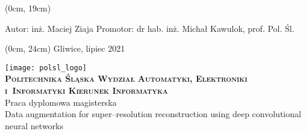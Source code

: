 \thispagestyle{empty}
\textblockorigin{3cm}{2.5cm}

\begin{onehalfspacing}
\begin{center}
    \begin{textblock*}{\textwidth}(0cm, 19cm)
	\begin{flushleft}
	Autor: inż. Maciej Ziaja \linebreak
	Promotor: dr hab. inż. Michał Kawulok, prof. Pol. Śl. \linebreak
	\end{flushleft}
	\end{textblock*}
	\begin{textblock*}{\textwidth}(0cm, 24cm)
	\fontsize{12}{12} \selectfont
	Gliwice, lipiec 2021
	\end{textblock*}
    \vspace{2\baselineskip}
	\texttt{[image: polsl\_logo]}\\
	\vspace{2\baselineskip}
	\fontsize{18}{18} \selectfont
	\textbf{\textsc{Politechnika Śląska \linebreak
	Wydział Automatyki, Elektroniki i~Informatyki \linebreak
	Kierunek Informatyka}} \\
	\vspace{3\baselineskip}
	Praca dyplomowa magisterska \\
	\vspace{3\baselineskip}
	\fontsize{14}{14} \selectfont
	Data augmentation for super--resolution reconstruction using deep convolutional neural networks
\end{center}
\end{onehalfspacing}
\restoregeometry
